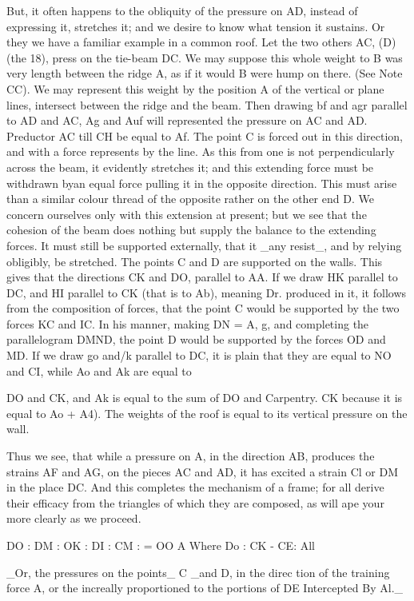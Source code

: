 But, it often happens to the obliquity of the pressure on AD, instead of expressing it, stretches it; and we desire to know what tension it sustains. Or they we have a familiar example in a common roof. Let the two others AC, (D) (the 18), press on the tie-beam DC. We may suppose this whole weight to B was very length between the ridge A, as if it would B were hump on there. (See Note CC). We may represent this weight by the position A of the vertical or plane lines, intersect between the ridge and the beam. Then drawing bf and agr parallel to AD and AC, Ag and Auf will represented the pressure on AC and AD. Preductor AC till CH be equal to Af. The point C is forced out in this direction, and with a force represents by the line. As this from one is not perpendicularly across the beam, it evidently stretches it; and this extending force must be withdrawn byan equal force pulling it in the opposite direction. This must arise than a similar colour thread of the opposite rather on the other end D. We concern ourselves only with this extension at present; but we see that the cohesion of the beam does nothing but supply the balance to the extending forces. It must still be supported externally, that it \_any resist\_, and by relying obligibly, be stretched. The points C and D are supported on the walls. This gives that the directions CK and DO, parallel to AA. If we draw HK parallel to DC, and HI parallel to CK (that is to Ab), meaning Dr. produced in it, it follows from the composition of forces, that the point C would be supported by the two forces KC and IC. In his manner, making DN = A, g, and completing the parallelogram DMND, the point D would be supported by the forces OD and MD. If we draw go and/k parallel to DC, it is plain that they are equal to NO and CI, while Ao and Ak are equal to\par\medskip
DO and CK, and Ak is equal to the sum of DO and Carpentry. CK because it is equal to Ao + A4). The weights of the roof is equal to its vertical pressure on the wall.\par\medskip
Thus we see, that while a pressure on A, in the direction AB, produces the strains AF and AG, on the pieces AC and AD, it has excited a strain Cl or DM in the place DC. And this completes the mechanism of a frame; for all derive their efficacy from the triangles of which they are composed, as will ape your more clearly as we proceed.\par\medskip
DO : DM : OK : DI : CM : = OO A Where Do : CK - CE: All\par\medskip
\_Or, the pressures on the points\_ C \_and D, in the direc tion of the training force A, or the increally proportioned to the portions of DE Intercepted By Al.\_\par\medskip
